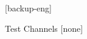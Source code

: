 \appendix
\backupbegin

\begin{frame}[noframenumbering]
\end{frame}

[backup-eng]

\begin{frame}{Test Channels}
[none]

\end{frame}



\backupend
